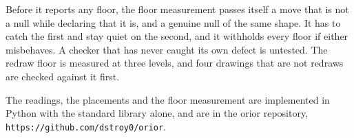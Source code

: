Before it reports any floor, the floor measurement passes itself a move that is not a null while declaring that it is, and a genuine null of the same shape. It has to catch the first and stay quiet on the second, and it withholds every floor if either misbehaves. A checker that has never caught its own defect is untested. The redraw floor is measured at three levels, and four drawings that are not redraws are checked against it first.

The readings, the placements and the floor measurement are implemented in Python with the standard library alone, and are in the orior repository, \texttt{https://github.com/dstroy0/orior}.
